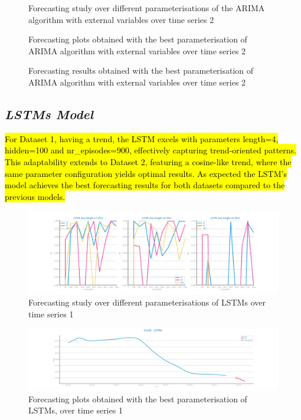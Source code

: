 \documentclass[10pt]{extarticle}
\newcommand{\ctext}[3][RGB]{%
  \begingroup
  \definecolor{hlcolor}{#1}{#2}\sethlcolor{hlcolor}%
  \hl{#3}%
  \endgroup
}
\begin{document}
\begin{figure}[H]
\caption{Forecasting study over different parameterisations of the ARIMA algorithm with external variables over time series 2}
\end{figure}

\begin{figure}[H]
\caption{Forecasting plots obtained with the best parameterisation of ARIMA algorithm with external variables over time series 2}
\end{figure}

\begin{figure}[H]
\caption{Forecasting results obtained with the best parameterisation of ARIMA algorithm with external variables over time series 2}
\end{figure}

\subsection*{\textit{LSTMs Model}}
\ctext[RGB]{190,190,190}{For Dataset 1, having a trend, the LSTM excels with parameters length=4, hidden=100 and nr\_episodes=900, effectively capturing trend-oriented patterns. This adaptability extends to Dataset 2, featuring a cosine-like trend, where the same parameter configuration yields optimal results. As expected the LSTM's model achieves the best forecasting results for both datasets compared to the previous models.}

\begin{figure}[H]
\centering\includegraphics[scale=0.4]{images/dataset1/time_series/Covid_lstm_study_R2.png}
\caption{Forecasting study over different parameterisations of LSTMs over time series 1}
\end{figure}

\begin{figure}[H]
\centering\includegraphics[scale=0.4]{images/dataset1/time_series/Covid - LSTMs _forecasting_series.png}
\caption{Forecasting plots obtained with the best parameterisation of LSTMs, over time series 1}
\end{figure}
\end{document}
